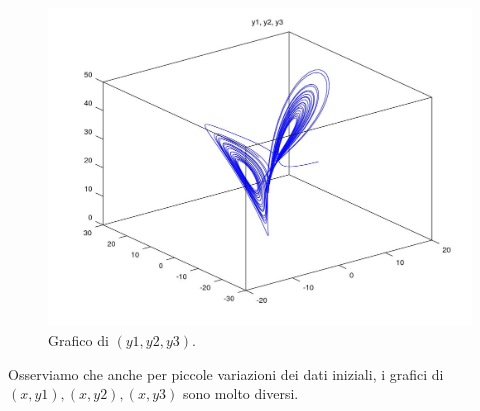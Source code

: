 \documentclass[11pt,a4paper,twoside,openright,titlepage,
headinclude,footinclude,BCOR5mm,
numbers=noenddot,cleardoublepage=empty,
tablecaptionabove]{scrbook}
\begin{document}
\begin{center}
\begin{figure}[h!]
\includegraphics[width=\textwidth]{figs/esercizio2_4.jpg}
\caption{Grafico di $(y1, y2, y3)$.}
\end{figure}
\end{center}

\newpage
Osserviamo che anche per piccole variazioni dei dati iniziali, i grafici di 
$(x, y1), (x, y2), (x, y3)$ sono molto diversi.

\newpage
\end{document}

